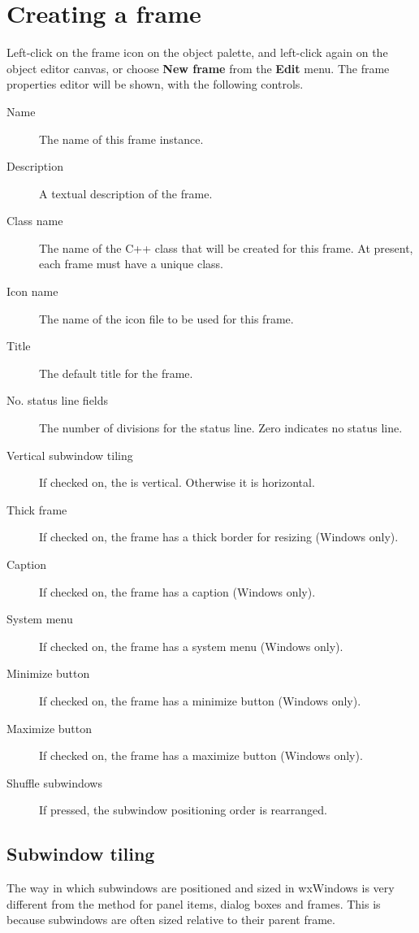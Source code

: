 \section{Creating a frame}

Left-click on the frame icon on the object palette, and left-click
again on the object editor canvas, or choose {\bf New frame} from
the {\bf Edit} menu. The frame properties editor will be shown,
with the following controls.

\begin{description}
\item[Name] The name of this frame instance.
\item[Description] A textual description of the frame.
\item[Class name] The name of the C++ class that will be created for
this frame. At present, each frame must have a unique class.
\item[Icon name] The name of the icon file to be used for this frame.
\item[Title] The default title for the frame.
\item[No. status line fields] The number of divisions for the status line.
Zero indicates no status line.
\item[Vertical subwindow tiling] If checked on, the \rtfsp
is vertical. Otherwise it is horizontal.
\item[Thick frame] If checked on, the frame has a thick border for resizing
(Windows only).
\item[Caption] If checked on, the frame has a caption (Windows only).
\item[System menu] If checked on, the frame has a system menu (Windows only).
\item[Minimize button] If checked on, the frame has a minimize button (Windows only).
\item[Maximize button] If checked on, the frame has a maximize button (Windows only).
\item[Shuffle subwindows] If pressed, the subwindow positioning order is rearranged.
\end{description}

\subsection{Subwindow tiling}\label{tiling}

The way in which subwindows are positioned and sized in wxWindows is very different
from the method for panel items, dialog boxes and frames. This is because
subwindows are often sized relative to their parent frame.

